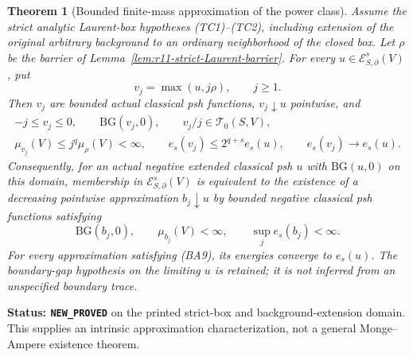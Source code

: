 \documentclass[11pt,a4paper]{article}
\numberwithin{equation}{section}
\newtheorem{theorem}{Theorem}[section]
\theoremstyle{definition}
\theoremstyle{remark}
\begin{document}
\begin{theorem}[Bounded finite-mass approximation of the power class]
\label{thm:r11-finite-mass-power-approximation}
Assume the strict analytic Laurent-box hypotheses (TC1)--(TC2),
including extension of the original arbitrary background to an
ordinary neighborhood of the closed box. Let $\rho$ be the
barrier of Lemma~\ref{lem:r11-strict-Laurent-barrier}.
For every $u\in\mathcal E^s_{S,\partial}(V)$, put
\[
                            v_j=\max(u,j\rho),\qquad j\geq1.
 \tag{BA7}
\]
Then $v_j$ are bounded actual classical psh functions,
$v_j\downarrow u$ pointwise, and
\[
 \begin{gathered}
 -j\leq v_j\leq0,\qquad \mathrm{BG}(v_j,0),\qquad
 v_j/j\in\mathscr T_0(S,V),\\
 \mu_{v_j}(V)\leq j^q\mu_\rho(V)<\infty,\qquad
 e_s(v_j)\leq2^{q+s}e_s(u),\qquad
 e_s(v_j)\longrightarrow e_s(u).
 \end{gathered}
 \tag{BA8}
\]
Consequently, for an actual negative extended classical psh
$u$ with $\mathrm{BG}(u,0)$ on this domain, membership in
$\mathcal E^s_{S,\partial}(V)$ is equivalent to the existence
of a decreasing pointwise approximation $b_j\downarrow u$
by bounded negative classical psh functions satisfying
\[
 \mathrm{BG}(b_j,0),\qquad \mu_{b_j}(V)<\infty,\qquad
                         \sup_j e_s(b_j)<\infty.
 \tag{BA9}
\]
For every approximation satisfying (BA9), its energies converge
to $e_s(u)$. The boundary-gap hypothesis on the limiting $u$
is retained; it is not inferred from an unspecified boundary trace.
\end{theorem}

\noindent\textbf{Status: \texttt{NEW\_PROVED}} on the printed
strict-box and background-extension domain. This supplies an
intrinsic approximation characterization, not a general
Monge--Ampere existence theorem.
\end{document}
